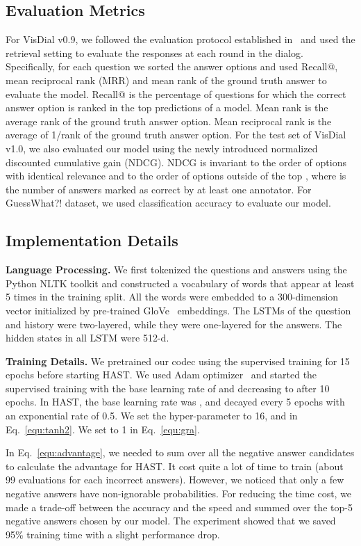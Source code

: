 \documentclass[10pt,twocolumn,letterpaper]{article}
\begin{document}
\subsection{Evaluation Metrics}
For VisDial v0.9, we followed the evaluation protocol established in~\cite{das2017visual} and used the retrieval setting to evaluate the responses at each round in the dialog. Specifically, for each question we sorted the answer options and used Recall@, mean reciprocal rank (MRR) and mean rank of the ground truth answer to evaluate the model. Recall@ is the percentage of questions for which the correct answer option is ranked in the top  predictions of a model. Mean rank is the average rank of the ground truth answer option. Mean reciprocal rank is the average of 1/rank of the ground truth answer option. For the test set of VisDial v1.0, we also evaluated our model using the newly introduced normalized discounted cumulative gain (NDCG). NDCG is invariant to the order of options with identical relevance and to the order of options outside of the top , where  is the number of answers marked as correct by at least one annotator. For GuessWhat?! dataset, we used classification accuracy to evaluate our model.

\subsection{Implementation Details}
\noindent\textbf{Language Processing.} We first tokenized the questions and answers using the Python NLTK toolkit and constructed a vocabulary of words that appear at least 5 times in the training split. All the words were embedded to a 300-dimension vector initialized by pre-trained GloVe~\cite{pennington2014glove} embeddings. The LSTMs of the question and history were two-layered, while they were one-layered for the answers. The hidden states in all LSTM were 512-d.

\noindent\textbf{Training Details.} We pretrained our codec using the supervised training for 15 epochs before starting HAST. We used Adam optimizer~\cite{kingma2014adam} and started the supervised training with the base learning rate of  and decreasing to  after 10 epochs. In HAST, the base learning rate was , and decayed every 5 epochs with an exponential rate of 0.5. We set the hyper-parameter  to 16, and  in Eq.~\eqref{equ:tanh2}. We set  to 1 in Eq.~\eqref{equ:gra}.

In Eq.~\eqref{equ:advantage}, we needed to sum over all the negative answer candidates to calculate the advantage for HAST. It cost quite a lot of time to train (about 99 evaluations for each incorrect answers). However, we noticed that only a few negative answers have non-ignorable probabilities. For reducing the time cost, we made a trade-off between the accuracy and the speed and summed over the top-5 negative answers chosen by our model. The experiment showed that we saved 95\% training time with a slight performance drop.
\end{document}
